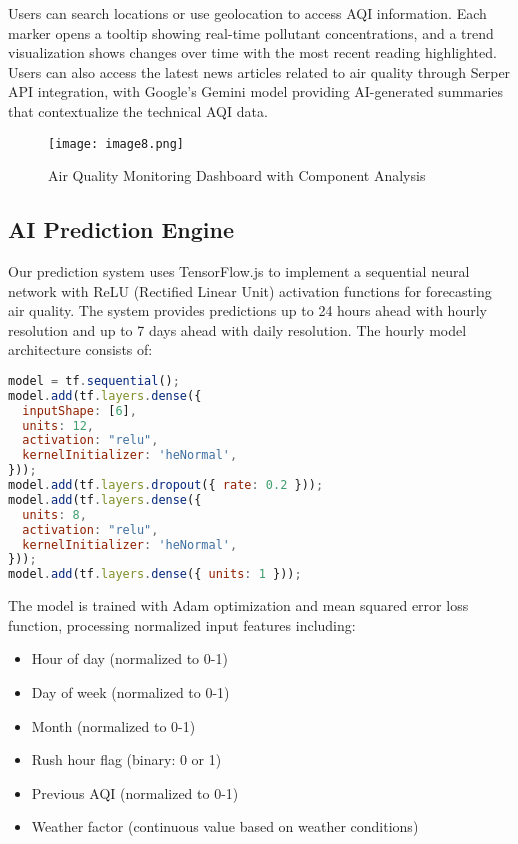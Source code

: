 \documentclass[conference]{IEEEtran}
\begin{document}
Users can search locations or use geolocation to access AQI information. Each marker opens a tooltip showing real-time pollutant concentrations, and a trend visualization shows changes over time with the most recent reading highlighted. Users can also access the latest news articles related to air quality through Serper API integration, with Google's Gemini model providing AI-generated summaries that contextualize the technical AQI data.

\begin{figure}
    \centering
    \texttt{[image: image8.png]}
    \caption{Air Quality Monitoring Dashboard with Component Analysis}
    \label{fig:dashboard}
\end{figure}

\subsection{AI Prediction Engine}
Our prediction system uses TensorFlow.js to implement a sequential neural network with ReLU (Rectified Linear Unit) activation functions for forecasting air quality. The system provides predictions up to 24 hours ahead with hourly resolution and up to 7 days ahead with daily resolution. The hourly model architecture consists of:

\begin{lstlisting}[language=JavaScript]
model = tf.sequential();
model.add(tf.layers.dense({
  inputShape: [6], 
  units: 12,
  activation: "relu",
  kernelInitializer: 'heNormal',
}));
model.add(tf.layers.dropout({ rate: 0.2 }));
model.add(tf.layers.dense({ 
  units: 8, 
  activation: "relu",
  kernelInitializer: 'heNormal',
}));
model.add(tf.layers.dense({ units: 1 }));
\end{lstlisting}

The model is trained with Adam optimization and mean squared error loss function, processing normalized input features including:
\begin{itemize}
    \item Hour of day (normalized to 0-1)
    \item Day of week (normalized to 0-1)
    \item Month (normalized to 0-1)
    \item Rush hour flag (binary: 0 or 1)
    \item Previous AQI (normalized to 0-1)
    \item Weather factor (continuous value based on weather conditions)
\end{itemize}
\end{document}

